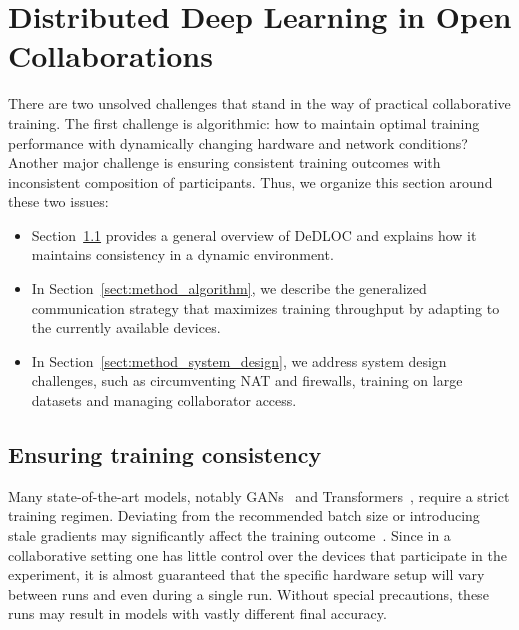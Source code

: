 \section{Distributed Deep Learning in Open Collaborations}
\label{sect:method}

There are two unsolved challenges that stand in the way of practical collaborative training. The first challenge is algorithmic: how to maintain optimal training performance with dynamically changing hardware and network conditions? Another major challenge is ensuring consistent training outcomes with inconsistent composition of participants. 
Thus, we organize this section around these two issues:

\begin{itemize}[leftmargin=*]
    \item Section~\ref{sect:method_general} provides a general overview of DeDLOC and explains how it maintains consistency in a dynamic environment.
    \item In Section~\ref{sect:method_algorithm}, we describe the generalized communication strategy that maximizes training throughput by adapting to the currently available devices.
    \item In Section~\ref{sect:method_system_design}, we address system design challenges, such as circumventing NAT and firewalls, training on large datasets and managing collaborator access.
\end{itemize}

\subsection{Ensuring training consistency}\label{sect:method_general}

Many state-of-the-art models, notably GANs~\cite{GAN} and Transformers~\cite{transformer}, require a strict training regimen. Deviating from the recommended batch size or introducing stale gradients may significantly affect the training outcome~\cite{trainingtips,liu-etal-2020-understanding,pipedream}. Since in a collaborative setting one has little control over the devices that participate in the experiment, it is almost guaranteed that the specific hardware setup will vary between runs and even during a single run. Without special precautions, these runs may result in models with vastly different final accuracy.


